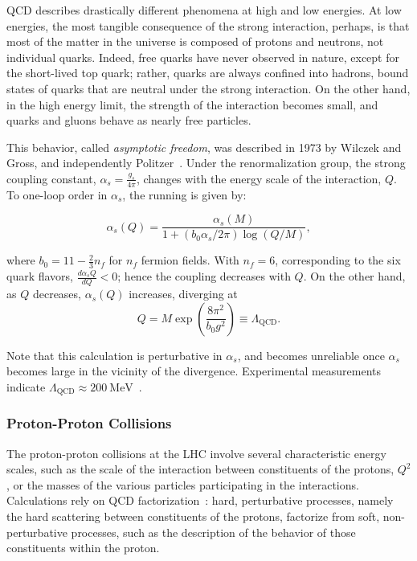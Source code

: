 QCD describes drastically different phenomena at high and low energies. At low energies, the most tangible consequence of the strong interaction, perhaps, is that most of the matter in the universe is composed of protons and neutrons, not individual quarks. Indeed, free quarks have never observed in nature, except for the short-lived top quark; rather, quarks are always confined into hadrons, bound states of quarks that are neutral under the strong interaction. On the other hand, in the high energy limit, the strength of the interaction becomes small, and quarks and gluons behave as nearly free particles.

This behavior, called \emph{asymptotic freedom}, was described in 1973 by Wilczek and Gross, and independently Politzer~\cite{Gross:1973id,Politzer:1973fx}. Under the renormalization group, the strong coupling constant, $\alpha_s = \frac{g_s}{4\pi}$, changes with the energy scale of the interaction, $Q$. To one-loop order in $\alpha_s$, the running is given by:

\begin{equation}
\alpha_s(Q) = \frac{\alpha_s(M)}{1 + (b_0 \alpha_s/2\pi)\log(Q/M)},
\end{equation}

where $b_0=11-\frac{2}{3}n_f$ for $n_f$ fermion fields. With $n_f=6$, corresponding to the six quark flavors, $\frac{d\alpha_s{Q}}{dQ}<0$; hence the coupling decreases with $Q$. On the other hand, as $Q$ decreases, $\alpha_s(Q)$ increases, diverging at
\begin{equation}
Q=M\exp\left(\frac{8\pi^2}{b_0g^2}\right) \equiv \Lambda_{\mathrm{QCD}}.
\end{equation}

Note that this calculation is perturbative in $\alpha_s$, and becomes unreliable once $\alpha_s$ becomes large in the vicinity of the divergence. Experimental measurements indicate $\Lambda_{\mathrm{QCD}}\approx \SI{200}{\mega\electronvolt}$~\cite{Campbell:1998gr}. 


\subsubsection{Proton-Proton Collisions}
The proton-proton collisions at the LHC involve several characteristic energy scales, such as the scale of the interaction between constituents of the protons, $Q^2$, or the masses of the various particles participating in the interactions. Calculations rely on QCD factorization~\cite{Collins:2004tz}: hard, perturbative processes, namely the hard scattering between constituents of the protons, factorize from soft, non-perturbative processes, such as the description of the behavior of those constituents within the proton. 

